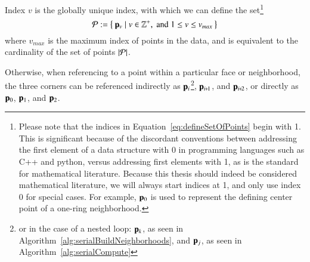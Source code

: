 Index $v$ is the globally unique index, with which we can define the set\footnote{Please note that the indices in Equation~\ref{eq:defineSetOfPoints} begin with 1. This is significant because of the discordant conventions between addressing the first element of a data structure with 0 in programming languages such as C++ and python, versus addressing first elements with 1, as is the standard for mathematical literature. Because this thesis should indeed be considered mathematical literature, we will always start indices at 1, and only use index 0 for special cases. For example, $\mathbf{p}_0$ is used to represent the defining center point of a one-ring neighborhood.}
\begin{equation}
	\mathcal{P} := \left \{\:\mathbf{p}_v \mid v \in \mathbb{Z}^+, \;\text{and}\; 1\leq v \leq v_{max}\:\right \}
	\label{eq:defineSetOfPoints}
\end{equation}
where $v_{max}$ is the maximum index of points in the data, and is equivalent to the cardinality of the set of points $|\mathcal{P}|$.%
%
%

Otherwise,
 when referencing to a point within a particular face or neighborhood, the three corners can be referenced indirectly as $\mathbf{p}_i$\footnote{or in the case of a nested loop: $\mathbf{p}_k$, as seen in Algorithm~\ref{alg:serialBuildNeighborhoods}, and $\mathbf{p}_j$, as seen in Algorithm~\ref{alg:serialCompute}}, $\bp_{\sipo}$, and $\bp_{\sipt}$, or directly as $\mathbf{p}_0$, $\mathbf{p}_1$, and $\mathbf{p}_2$.%
%
%
